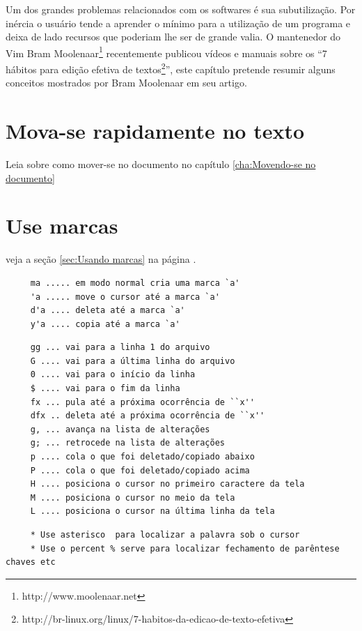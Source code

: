 \documentclass[10pt,a4paper,openany]{book}
\begin{document}
Um dos grandes problemas relacionados com os softwares é sua subutilização. Por
inércia o usuário tende a aprender o mínimo para a utilização de um programa e
deixa de lado recursos que poderiam lhe ser de grande valia. O mantenedor do
Vim  Bram Moolenaar\footnote{http://www.moolenaar.net} recentemente publicou vídeos
e manuais sobre os ``7 hábitos para edição efetiva de
textos\footnote{http://br-linux.org/linux/7-habitos-da-edicao-de-texto-efetiva}'',
este capítulo pretende resumir alguns conceitos mostrados por Bram Moolenaar em
seu artigo.

\section{Mova-se rapidamente no texto}
\label{sec:Mova-se rapidamente no texto}

Leia sobre como mover-se no documento no capítulo \ref{cha:Movendo-se no documento}

\section{Use marcas}
veja a seção \ref{sec:Usando marcas} na página \pageref{sec:Usando marcas}.

\begin{verbatim}
     ma ..... em modo normal cria uma marca `a'
     'a ..... move o cursor até a marca `a'
     d'a .... deleta até a marca `a'
     y'a .... copia até a marca `a'
\end{verbatim}



\begin{verbatim}
     gg ... vai para a linha 1 do arquivo
     G .... vai para a última linha do arquivo
     0 .... vai para o início da linha
     $ .... vai para o fim da linha
     fx ... pula até a próxima ocorrência de ``x''
     dfx .. deleta até a próxima ocorrência de ``x''
     g, ... avança na lista de alterações
     g; ... retrocede na lista de alterações
     p .... cola o que foi deletado/copiado abaixo
     P .... cola o que foi deletado/copiado acima
     H .... posiciona o cursor no primeiro caractere da tela
     M .... posiciona o cursor no meio da tela
     L .... posiciona o cursor na última linha da tela
\end{verbatim}

\begin{verbatim}
     * Use asterisco  para localizar a palavra sob o cursor
     * Use o percent % serve para localizar fechamento de parêntese chaves etc
\end{verbatim}
\end{document}
